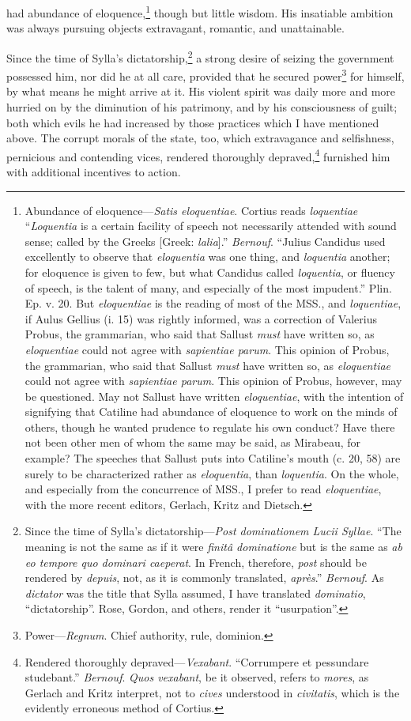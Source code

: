 had abundance of eloquence,\footnote{Abundance of eloquence—\emph{Satis eloquentiae}. Cortius reads
\emph{loquentiae} ``\emph{Loquentia} is a certain facility of speech not
necessarily attended with sound sense; called by the Greeks [Greek:
\emph{lalia}].'' \emph{Bernouf}. ``Julius Candidus used excellently to observe
that \emph{eloquentia} was one thing, and \emph{loquentia} another; for
eloquence is given to few, but what Candidus called \emph{loquentia}, or
fluency of speech, is the talent of many, and especially of the most
impudent.'' Plin. Ep. v. 20. But \emph{eloquentiae} is the reading of most
of the MSS., and \emph{loquentiae}, if Aulus Gellius (i. 15) was rightly
informed, was a correction of Valerius Probus, the grammarian, who
said that Sallust \emph{must} have written so, as \emph{eloquentiae} could not
agree with \emph{sapientiae parum}. This opinion of Probus, the grammarian,
who said that Sallust \emph{must} have written so, as \emph{eloquentiae} could
not agree with \emph{sapientiae parum}. This opinion of Probus, however,
may be questioned. May not Sallust have written \emph{eloquentiae}, with
the intention of signifying that Catiline had abundance of eloquence
to work on the minds of others, though he wanted prudence to regulate
his own conduct? Have there not been other men of whom the same may be
said, as Mirabeau, for example? The speeches that Sallust puts into
Catiline's mouth (c. 20, 58) are surely to be characterized rather as
\emph{eloquentia}, than \emph{loquentia}. On the whole, and especially from the
concurrence of MSS., I prefer to read \emph{eloquentiae}, with the more
recent editors, Gerlach, Kritz and Dietsch.} though but little wisdom. His
insatiable ambition was always pursuing objects extravagant, romantic,
and unattainable.

Since the time of Sylla's dictatorship,\footnote{Since the time of Sylla's dictatorship—\emph{Post dominationem
Lucii Syllae}. ``The meaning is not the same as if it were \emph{finitâ
dominatione} but is the same as \emph{ab eo tempore quo dominari caeperat}.
In French, therefore, \emph{post} should be rendered by \emph{depuis}, not, as
it is commonly translated, \emph{après}.'' \emph{Bernouf}. As \emph{dictator} was the
title that Sylla assumed, I have translated \emph{dominatio}, ``dictatorship''.
Rose, Gordon, and others, render it ``usurpation''.} a strong desire of seizing
the government possessed him, nor did he at all care, provided that he
secured power\footnote{Power—\emph{Regnum}. Chief authority, rule, dominion.} for himself, by what means he might arrive at it.
His violent spirit was daily more and more hurried on by the
diminution of his patrimony, and by his consciousness of guilt; both
which evils he had increased by those practices which I have mentioned
above. The corrupt morals of the state, too, which extravagance and
selfishness, pernicious and contending vices, rendered thoroughly
depraved,\footnote{Rendered thoroughly depraved—\emph{Vexabant}. ``Corrumpere et
pessundare studebant.'' \emph{Bernouf}. \emph{Quos vexabant}, be it observed,
refers to \emph{mores}, as Gerlach and Kritz interpret, not to \emph{cives}
understood in \emph{civitatis}, which is the evidently erroneous method of
Cortius.} furnished him with additional incentives to action.

